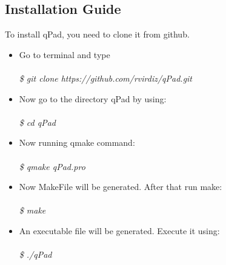\subsection{Installation Guide}
To install qPad, you need to clone it from github.
\begin{itemize}
\item Go to terminal and type\\\\
\emph{\$ git clone https://github.com/rvirdiz/qPad.git}
\item Now go to the directory qPad by using: \\\\
\emph{\$ cd qPad}
\item Now running qmake command: \\\\
\emph{\$ qmake qPad.pro}
\item Now MakeFile will be generated. After that run make: \\\\
\emph{\$ make}
\item An executable file will be generated. Execute it using: \\\\
\emph{\$ ./qPad}
\end{itemize}
